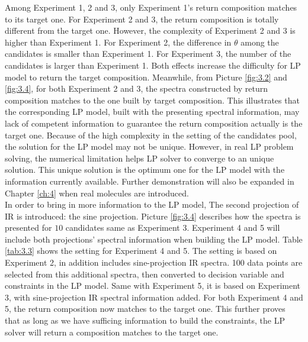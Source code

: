 Among Experiment 1, 2 and 3, only Experiment 1's return composition matches to its target one. For Experiment 2 and 3, the return composition is totally different from the target one. However, the complexity of Experiment 2 and 3 is higher than Experiment 1. For Experiment 2, the difference in $\theta$ among the candidates is smaller than Experiment 1. For Experiment 3, the number of the candidates is larger than Experiment 1. Both effects increase the difficulty for LP model to return the target composition. Meanwhile, from Picture \ref{fig:3.2} and \ref{fig:3.4}, for both Experiment 2 and 3, the spectra constructed by return composition matches to the one built by target composition. This illustrates that the corresponding LP model, built with the presenting spectral information, may lack of competent information to guarantee the return composition actually  is the target one. Because of the high complexity in the setting of the candidates pool, the solution for the LP model may not be unique. However, in real LP problem solving, the numerical limitation helps LP solver to converge to an unique solution. This unique solution is the optimum one for the LP model with the information currently available. Further demonstration will also be expanded in Chapter \ref{ch:4} when real molecules are introduced. \\

In order to bring in more information to the LP model, The second projection of IR is introduced: the sine projection. Picture \ref{fig:3.4} describes how the spectra is presented for $10$ candidates same as Experiment 3. Experiment 4 and 5 will include both projections' spectral information when building the LP model. Table \ref{tab:3.3} shows the setting for Experiment 4 and 5. The setting is based on Experiment 2, in addition includes sine-projection IR spectra. 100 data points are selected from this additional spectra, then converted to decision variable and constraints in the LP model. Same with Experiment 5, it is based on Experiment 3, with sine-projection IR spectral information added. For both Experiment 4 and 5, the return composition now matches to the target one. This further proves that as long as we have sufficing information to build the constraints, the LP solver will return a composition matches to the target one. \\ 

